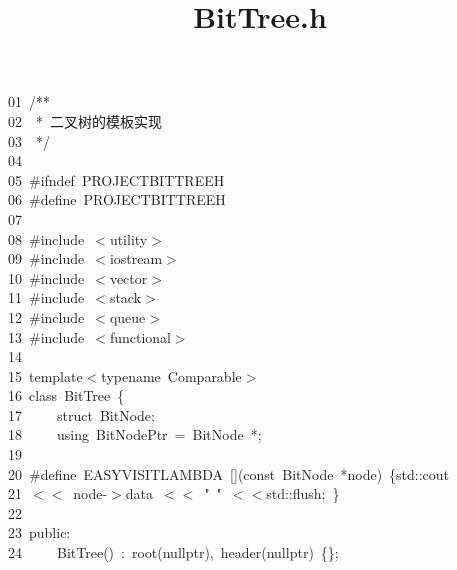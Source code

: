\documentclass[11pt,a4paper]{ctexart}
\title{BitTree.h}
\newcommand{\hlstd}[1]{\textcolor[rgb]{0.2,0.2,0.2}{#1}}
\newcommand{\hlpps}[1]{\textcolor[rgb]{0.06,0.58,0.63}{#1}}
\newcommand{\hlcom}[1]{\textcolor[rgb]{0.59,0.59,0.59}{#1}}
\newcommand{\hlppc}[1]{\textcolor[rgb]{0.41,0.78,0.23}{#1}}
\newcommand{\hlopt}[1]{\textcolor[rgb]{0.2,0.2,0.2}{#1}}
\newcommand{\hllin}[1]{\textcolor[rgb]{0.59,0.59,0.59}{#1}}
\newcommand{\hlkwa}[1]{\textcolor[rgb]{0.23,0.42,0.78}{#1}}
\newcommand{\hlkwb}[1]{\textcolor[rgb]{0.63,0,0.31}{#1}}
\newcommand{\hlkwc}[1]{\textcolor[rgb]{0,0.63,0.31}{#1}}
\newcommand{\hlkwd}[1]{\textcolor[rgb]{0.78,0.23,0.41}{#1}}
\begin{document}
\pagecolor{bgcolor}
\noindent
\ttfamily
\hlstd{}\hllin{01\ }\hlstd{}\hlcom{/{*}{*}}\\
\hllin{02\ }\hlcom{\ {*}\ 二叉树的模板实现}\\
\hllin{03\ }\hlcom{\ {*}/}\hlstd{}\\
\hllin{04\ }\hlstd{}\\
\hllin{05\ }\hlstd{}\hlppc{\#ifndef\ PROJECT\textunderscore BITTREE\textunderscore H}\\
\hllin{06\ }\hlstd{}\hlppc{\#define\ PROJECT\textunderscore BITTREE\textunderscore H}\\
\hllin{07\ }\hlstd{}\\
\hllin{08\ }\hlstd{}\hlppc{\#include\ $<$utility$>$}\\
\hllin{09\ }\hlstd{}\hlppc{\#include\ $<$iostream$>$}\\
\hllin{10\ }\hlstd{}\hlppc{\#include\ $<$vector$>$}\\
\hllin{11\ }\hlstd{}\hlppc{\#include\ $<$stack$>$}\\
\hllin{12\ }\hlstd{}\hlppc{\#include\ $<$queue$>$}\\
\hllin{13\ }\hlstd{}\hlppc{\#include\ $<$functional$>$}\\
\hllin{14\ }\hlstd{}\\
\hllin{15\ }\hlstd{}\hlkwc{template}\hlstd{}\hlopt{$<$}\hlstd{typename\ Comparable}\hlopt{$>$}\\
\hllin{16\ }\hlstd{}\hlkwc{class\ }\hlstd{BitTree\ }\hlopt{\{}\\
\hllin{17\ }\hlstd{}\hlstd{\ \ \ \ }\hlstd{}\hlkwb{struct\ }\hlstd{BitNode}\hlopt{;}\\
\hllin{18\ }\hlstd{}\hlstd{\ \ \ \ }\hlstd{}\hlkwa{using\ }\hlstd{BitNodePtr\ }\hlopt{=\ }\hlstd{BitNode\ }\hlopt{{*};}\\
\hllin{19\ }\hlstd{}\\
\hllin{20\ }\hlstd{}\hlppc{\#define\ EASY\textunderscore VISIT\textunderscore LAMBDA\ {[}{]}(const\ BitNode\ {*}node)\ \{std::cout\ }\Righttorque\\
\hllin{21\ }\hlppc{$<$$<$\ node{-}$>$data\ $<$$<$\ }\hlpps{"\ "}\hlppc{\ $<$$<$std::flush;\ \}}\\
\hllin{22\ }\hlstd{}\\
\hllin{23\ }\hlstd{}\hlkwc{public}\hlstd{}\hlopt{:}\\
\hllin{24\ }\hlstd{}\hlstd{\ \ \ \ }\hlstd{}\hlkwd{BitTree}\hlstd{}\hlopt{()\ :\ }\hlstd{}\hlkwd{root}\hlstd{}\hlopt{(}\hlstd{}\hlkwc{nullptr}\hlstd{}\hlopt{),\ }\hlstd{}\hlkwd{header}\hlstd{}\hlopt{(}\hlstd{}\hlkwc{nullptr}\hlstd{}\hlopt{)\ \{\};}\\
\end{document}
